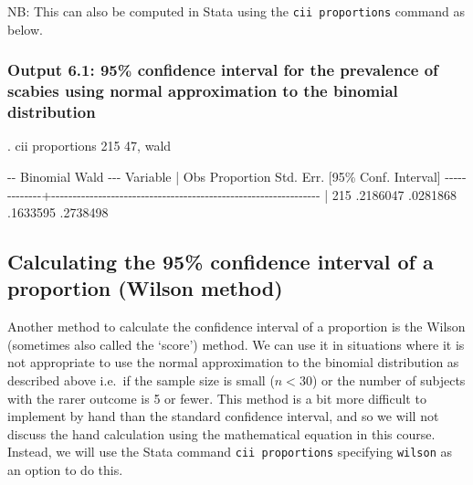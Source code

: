 \documentclass[
]{memoir}
\newenvironment{Shaded}{\begin{snugshade}}{\end{snugshade}}
\newcommand{\NormalTok}[1]{#1}
\begin{document}
NB: This can also be computed in Stata using the \texttt{cii\ proportions} command as below.

\hypertarget{output-6.1-95-confidence-interval-for-the-prevalence-of-scabies-using-normal-approximation-to-the-binomial-distribution}{%
\subsubsection{Output 6.1: 95\% confidence interval for the prevalence of scabies using normal approximation to the binomial distribution}\label{output-6.1-95-confidence-interval-for-the-prevalence-of-scabies-using-normal-approximation-to-the-binomial-distribution}}

\begin{Shaded}
\begin{Highlighting}[]
\NormalTok{. cii proportions 215 47, wald}

\NormalTok{                                                         {-}{-} Binomial Wald {-}{-}{-}}
\NormalTok{    Variable |        Obs  Proportion    Std. Err.       [95\% Conf. Interval]}
\NormalTok{{-}{-}{-}{-}{-}{-}{-}{-}{-}{-}{-}{-}{-}+{-}{-}{-}{-}{-}{-}{-}{-}{-}{-}{-}{-}{-}{-}{-}{-}{-}{-}{-}{-}{-}{-}{-}{-}{-}{-}{-}{-}{-}{-}{-}{-}{-}{-}{-}{-}{-}{-}{-}{-}{-}{-}{-}{-}{-}{-}{-}{-}{-}{-}{-}{-}{-}{-}{-}{-}{-}{-}{-}{-}{-}{-}{-}}
\NormalTok{             |        215    .2186047    .0281868        .1633595    .2738498}
\end{Highlighting}
\end{Shaded}

\hypertarget{calculating-the-95-confidence-interval-of-a-proportion-wilson-method}{%
\subsection{Calculating the 95\% confidence interval of a proportion (Wilson method)}\label{calculating-the-95-confidence-interval-of-a-proportion-wilson-method}}

Another method to calculate the confidence interval of a proportion is the Wilson (sometimes also called the `score') method. We can use it in situations where it is not appropriate to use the normal approximation to the binomial distribution as described above i.e.~if the sample size is small (\(n < 30\)) or the number of subjects with the rarer outcome is 5 or fewer. This method is a bit more difficult to implement by hand than the standard confidence interval, and so we will not discuss the hand calculation using the mathematical equation in this course. Instead, we will use the Stata command \texttt{cii\ proportions} specifying \texttt{wilson} as an option to do this.
\end{document}
